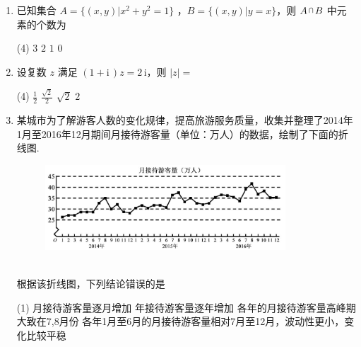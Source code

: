 \documentclass[12pt,twoside,space]{ctexart}
\begin{document}
\begin{enumerate}[itemsep=0.2em,topsep=0pt]
\item 已知集合 $A=\{(x,y)|x^2+y^2=1\}$ ，$B=\{(x,y)|y=x\}$，则 $A{\,\raisebox{0.8mm}{\scaleobj{0.55}{\bigcap}}\,}B$ 中元素的个数为
\begin{tasks}(4)
	\task $3$ \task $2$ \task $1$ \task $0$ 
\end{tasks}
\item 设复数 $z$ 满足 $(1+\mathrm{i}\,)z=2\,\mathrm{i}$，则 $|z|=$
\begin{tasks}(4)
	\task $\frac{1}{2}$ \task $\frac{\sqrt{2}}{2}$ \task $\sqrt{2}$ \task $2$
\end{tasks}
\item 某城市为了解游客人数的变化规律，提高旅游服务质量，收集并整理了2014年1月至2016年12月期间月接待游客量（单位：万人）的数据，绘制了下面的折线图.\\[-2.5em]
\begin{figure}[htbp]
\centering
\includegraphics[width=0.85\textwidth]{zxt.jpg}
\end{figure}\\[-1.5em]
根据该折线图，下列结论错误的是
\begin{tasks}(1)
	\task 月接待游客量逐月增加 
	\task 年接待游客量逐年增加
	\task 各年的月接待游客量高峰期大致在7,8月份 
	\task 各年1月至6月的月接待游客量相对7月至12月，波动性更小，变化比较平稳 
\end{tasks}


\end{enumerate}
\end{document}
